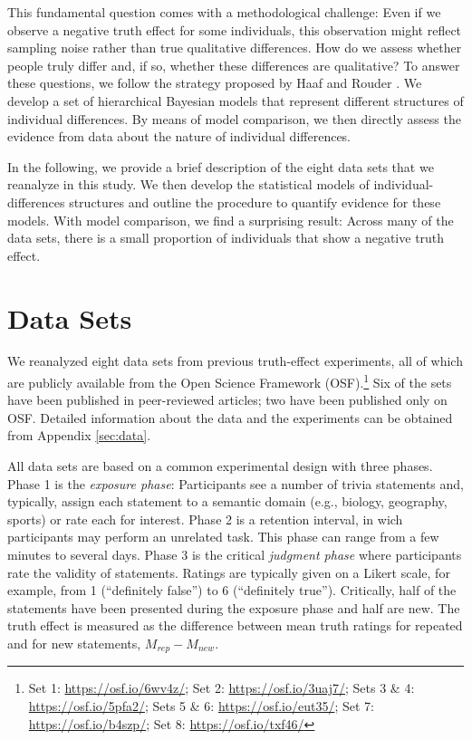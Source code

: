 \documentclass[
  english,
  ,man,floatsintext]{apa6}
\begin{document}
This fundamental question comes with a methodological challenge: Even if we observe a negative truth effect for some individuals, this observation might reflect sampling noise rather than true qualitative differences. How do we assess whether people truly differ and, if so, whether these differences are qualitative? To answer these questions, we follow the strategy proposed by Haaf and Rouder \autocite*{haaf2017,haaf2019}. We develop a set of hierarchical Bayesian models that represent different structures of individual differences. By means of model comparison, we then directly assess the evidence from data about the nature of individual differences.

In the following, we provide a brief description of the eight data sets that we reanalyze in this study. We then develop the statistical models of individual-differences structures and outline the procedure to quantify evidence for these models. With model comparison, we find a surprising result: Across many of the data sets, there is a small proportion of individuals that show a negative truth effect.

\hypertarget{data-sets}{%
\section{Data Sets}\label{data-sets}}

We reanalyzed eight data sets from previous truth-effect experiments, all of which are publicly available from the Open Science Framework (OSF).\footnote{Set 1: \url{https://osf.io/6wv4z/}; Set 2: \url{https://osf.io/3uaj7/}; Sets 3 \& 4: \url{https://osf.io/5pfa2/}; Sets 5 \& 6: \url{https://osf.io/eut35/}; Set 7: \url{https://osf.io/b4szp/}; Set 8: \url{https://osf.io/txf46/}} Six of the sets have been published in peer-reviewed articles; two have been published only on OSF. Detailed information about the data and the experiments can be obtained from Appendix \ref{sec:data}.

All data sets are based on a common experimental design with three phases. Phase 1 is the \textit{exposure phase}: Participants see a number of trivia statements and, typically, assign each statement to a semantic domain (e.g., biology, geography, sports) or rate each for interest. Phase 2 is a retention interval, in wich participants may perform an unrelated task. This phase can range from a few minutes to several days. Phase 3 is the critical \textit{judgment phase} where participants rate the validity of statements. Ratings are typically given on a Likert scale, for example, from 1 (``definitely false'') to 6 (``definitely true''). Critically, half of the statements have been presented during the exposure phase and half are new. The truth effect is measured as the difference between mean truth ratings for repeated and for new statements, \(M_{rep} - M_{new}\).
\end{document}
